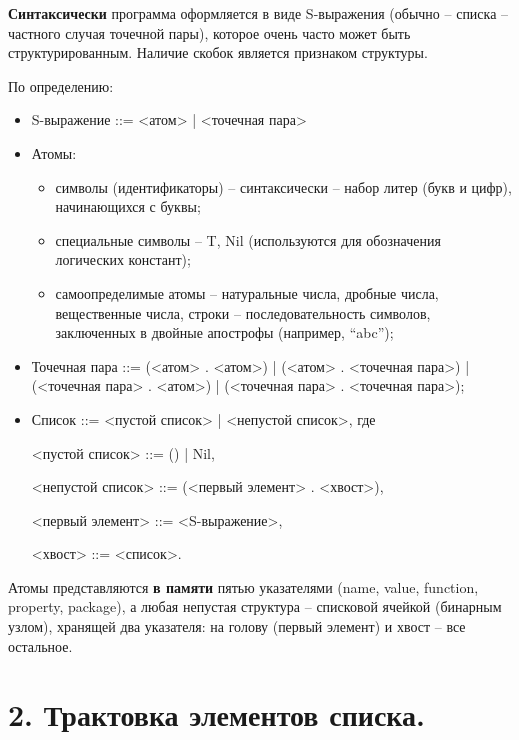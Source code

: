 \documentclass[12pt]{report}
\begin{document}
\textbf{Синтаксически} программа оформляется в виде S-выражения (обычно -- списка -- частного случая точечной пары), которое очень часто может быть структурированным. Наличие скобок является признаком структуры. 

По определению:
\begin{itemize}
	\item S-выражение ::= <атом> | <точечная пара>

	\item Атомы:
\begin{itemize} 
	\item символы (идентификаторы) – синтаксически – набор литер (букв и цифр), начинающихся с буквы;
	\item специальные символы – {T, Nil} (используются для обозначения логических констант);
	\item самоопределимые атомы – натуральные числа, дробные числа, вещественные числа, строки – последовательность символов, заключенных в двойные апострофы (например, “abc”);
\end{itemize} 


\item Точечная пара ::= (<атом> . <атом>) | (<атом> . <точечная пара>) | (<точечная пара> . <атом>) | (<точечная пара> . <точечная пара>);

\item Список ::= <пустой список> | <непустой список>, где 

<пустой список> ::= () | Nil,

<непустой список> ::= (<первый элемент> . <хвост>),

<первый элемент> ::= <S-выражение>,

<хвост> ::= <список>.

\end{itemize}

Атомы представляются \textbf{в памяти} пятью указателями  (name, value, function, property, package), а любая непустая структура --  списковой ячейкой (бинарным узлом), хранящей два указателя: на голову (первый элемент) и хвост -- все остальное.











\section*{2. Трактовка элементов списка.}
\end{document}
